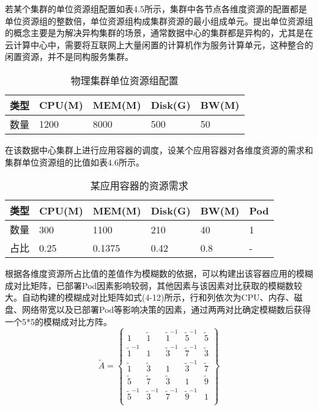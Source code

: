 若某个集群的单位资源组配置如表4.5所示，集群中各节点各维度资源的配置都是单位资源组的整数倍，单位资源组构成集群资源的最小组成单元。提出单位资源组的概念主要是为解决异构集群的场景，通常数据中心的集群都是异构的，尤其是在云计算中心中，需要将互联网上大量闲置的计算机作为服务计算单元，这种整合的闲置资源，并不是同构服务集群。
\begin{table}[htbp]
	\centering\dawu[1.3]
	\caption{物理集群单位资源组配置}
	\begin{tabular}{|p{2cm}<{\centering}|p{2cm}<{\centering}|p{2cm}<{\centering}|p{2cm}<{\centering}|p{2cm}<{\centering}|} \hline
		类型 & CPU(M) & MEM(M) & Disk(G) & BW(M) \\ \hline
		数量 & 1200 & 8000 & 500 & 50  \\ \hline
	\end{tabular}
\end{table}

在该数据中心集群上进行应用容器的调度，设某个应用容器对各维度资源的需求和集群单位资源组的比值如表4.6所示。
\begin{table}[htbp]
	\centering\dawu[1.3]
	\caption{某应用容器的资源需求}
	\begin{tabular}{|p{1.8cm}<{\centering}|p{1.8cm}<{\centering}|p{1.8cm}<{\centering}|p{1.8cm}<{\centering}|p{1.8cm}<{\centering}|p{1.8cm}<{\centering}|} \hline
		类型 & CPU(M) & MEM(M) & Disk(G) & BW(M) & Pod \\ \hline
		数量 & 300 & 1100 & 210 & 40 & 1 \\ \hline
		占比 & 0.25 & 0.1375 & 0.42 & 0.8 & - \\ \hline
	\end{tabular}
\end{table}

根据各维度资源所占比值的差值作为模糊数的依据，可以构建出该容器应用的模糊成对比矩阵，已部署Pod因素影响较弱，其他因素与该因素对比获取的模糊数较大。自动构建的模糊成对比矩阵如式(4-12)所示，行和列依次为CPU、内存、磁盘、网络带宽以及已部署Pod等影响决策的因素，通过两两对比确定模糊数后获得一个5*5的模糊成对比方阵。
\begin{equation}
\widetilde{A} = \left\{\begin{array}{ccccc}
1 & \widetilde{1} & \widetilde{1}^{-1} & \widetilde{5}^{-1} & \widetilde{5}  \\
\widetilde{1}^{-1} & 1 & \widetilde{3}^{-1} & \widetilde{7}^{-1} & \widetilde{3} \\
\widetilde{1} & \widetilde{3} & 1 & \widetilde{3}^{-1} & \widetilde{7} \\
\widetilde{5} & \widetilde{7} & \widetilde{3} & 1 & \widetilde{9} \\
\widetilde{5}^{-1} & \widetilde{3}^{-1} & \widetilde{7}^{-1} & \widetilde{9}^{-1} & 1 \\
\end{array}\right\}
\end{equation}

